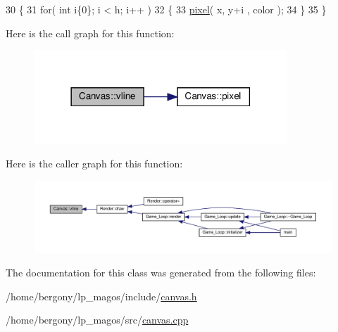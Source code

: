 \begin{DoxyCode}
30 \{
31     \textcolor{keywordflow}{for}( \textcolor{keywordtype}{int} i\{0\}; i < h; i++ )
32     \{
33         \hyperlink{classCanvas_aa189a705135fb14f427747084763143a}{pixel}( x, y+i , color );
34     \}
35 \}
\end{DoxyCode}
Here is the call graph for this function\+:\nopagebreak
\begin{figure}[H]
\begin{center}
\leavevmode
\includegraphics[width=270pt]{classCanvas_af81ae19142bc132665e053ce5de15211_cgraph}
\end{center}
\end{figure}
Here is the caller graph for this function\+:\nopagebreak
\begin{figure}[H]
\begin{center}
\leavevmode
\includegraphics[width=350pt]{classCanvas_af81ae19142bc132665e053ce5de15211_icgraph}
\end{center}
\end{figure}


The documentation for this class was generated from the following files\+:\begin{DoxyCompactItemize}
\item 
/home/bergony/lp\+\_\+magos/include/\hyperlink{canvas_8h}{canvas.\+h}\item 
/home/bergony/lp\+\_\+magos/src/\hyperlink{canvas_8cpp}{canvas.\+cpp}\end{DoxyCompactItemize}
